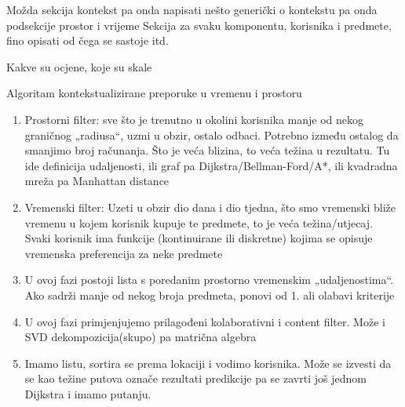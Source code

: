 \documentclass[times, utf8, diplomski, numeric]{fer}
\begin{document}
Možda sekcija kontekst pa onda napisati nešto generički o kontekstu pa onda
podsekcije prostor i vrijeme
Sekcija za svaku komponentu, korisnika i predmete, fino opisati od čega se
sastoje itd.

Kakve su ocjene, koje su skale

\begin{algorithm}[!htbp]
	\caption{Algoritam kontekstualizirane preporuke u vremenu i prostoru}
	\label{algo:TheAlgo}
	\begin{algorithmic}[1]
		
		\ENDFOR
		
		
		\ENDFOR
		
		
	\end{algorithmic}
\end{algorithm}

\begin{enumerate}
  \item Prostorni filter: sve što je trenutno u okolini korisnika manje od
  nekog graničnog „radiusa“, uzmi u obzir, ostalo odbaci. Potrebno između
  ostalog da smanjimo broj računanja. Što je veća blizina, to veća težina u
  rezultatu. Tu ide definicija udaljenosti, ili graf pa
  Dijkstra/Bellman-Ford/A*, ili kvadradna mreža pa Manhattan distance
  
  \item Vremenski filter: Uzeti u obzir dio dana i dio tjedna, što smo
  vremenski bliže vremenu u kojem korisnik kupuje te predmete, to je veća
  težina/utjecaj. Svaki korisnik ima funkcije (kontinuirane ili diskretne)
  kojima se opisuje vremenska preferencija za neke predmete
  
  \item U ovoj fazi postoji lista s poredanim prostorno vremenskim
  „udaljenostima“. Ako sadrži manje od nekog broja predmeta, ponovi od 1. ali
  olabavi kriterije
  
  \item U ovoj fazi primjenjujemo prilagođeni kolaborativni i content filter.
  Može i SVD dekompozicija(skupo) pa matrična algebra
  
  \item Imamo listu, sortira se prema lokaciji i vodimo korisnika. Može se
  izvesti da se kao težine putova označe rezultati predikcije pa se zavrti još
  jednom Dijkstra i imamo putanju.
  
\end{enumerate}
\end{document}
